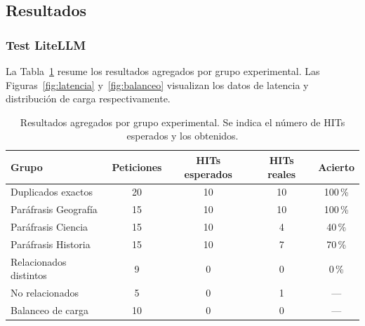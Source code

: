 \subsection{Resultados}
\subsubsection{Test LiteLLM}
La Tabla~\ref{tab:resultados} resume los resultados agregados por grupo experimental. Las Figuras~\ref{fig:latencia} y~\ref{fig:balanceo} visualizan los datos de latencia y distribución de carga respectivamente.

\begin{table}[H]
    \centering
    \caption{Resultados agregados por grupo experimental. Se indica el número de HITs esperados y los obtenidos.}
    \label{tab:resultados}
    \begin{tabular}{lcccc}
        \toprule
        \textbf{Grupo} & \textbf{Peticiones} & \textbf{HITs esperados} & \textbf{HITs reales} & \textbf{Acierto} \\
        \midrule
        Duplicados exactos      & 20 & 10 & 10 & 100\,\% \\
        Paráfrasis Geografía    & 15 & 10 & 10 & 100\,\% \\
        Paráfrasis Ciencia      & 15 & 10 &  4 &  40\,\% \\
        Paráfrasis Historia     & 15 & 10 &  7 &  70\,\% \\
        Relacionados distintos  &  9 &  0 &  0 &   0\,\% \\
        No relacionados         &  5 &  0 &  1 & ---    \\
        Balanceo de carga       & 10 &  0 &  0 & ---    \\
        \bottomrule
    \end{tabular}
\end{table}

